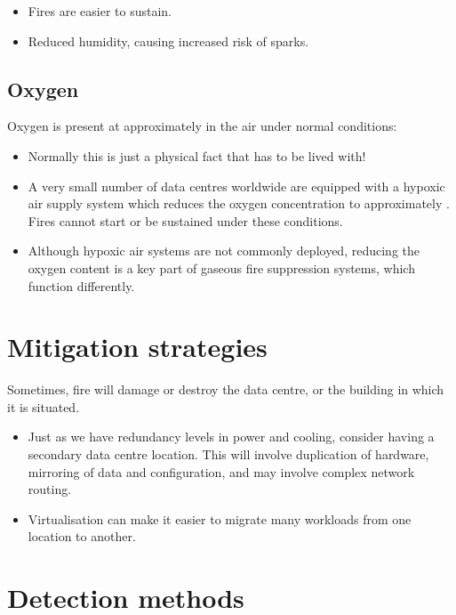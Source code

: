 \documentclass{pgnotes}
\begin{document}
\begin{itemize}
\item
  Fires are easier to sustain.
\item
  Reduced humidity, causing increased risk of sparks.
\end{itemize}

\subsection{Oxygen}
\label{sec:oxygen}

Oxygen is present at approximately in the air under normal conditions:

\begin{itemize}
\item
  Normally this is just a physical fact that has to be lived with!
\item
  A very small number of data centres worldwide are equipped with a
  hypoxic air supply system which reduces the oxygen concentration to
  approximately . Fires cannot start or be sustained under these
  conditions.
\item
  Although hypoxic air systems are not commonly deployed, reducing the
  oxygen content is a key part of gaseous fire suppression systems,
  which function differently.
\end{itemize}

\section{Mitigation strategies}
\label{sec:mitigation-strategies}

Sometimes, fire will damage or destroy the data centre, or the building
in which it is situated.

\begin{itemize}
\item
  Just as we have redundancy levels in power and cooling, consider
  having a secondary data centre location. This will involve duplication
  of hardware, mirroring of data and configuration, and may involve
  complex network routing.
\item
  Virtualisation can make it easier to migrate many workloads from one
  location to another.
\end{itemize}

\section{Detection methods}
\label{sec:detection-methods}
\end{document}
